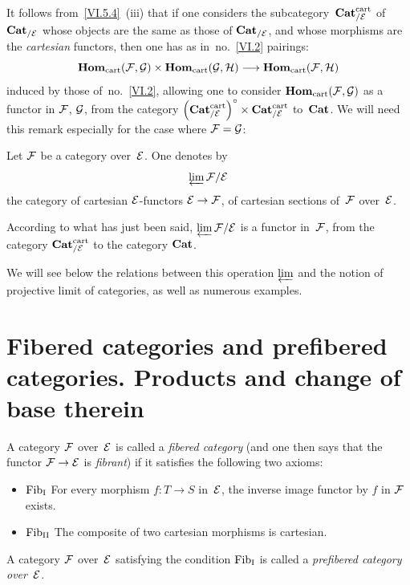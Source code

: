 It follows from~\ref{VI.5.4}~(iii) that if one considers the
subcategory~$\Cat^\cart_{/\cal{E}}$
of~$\Cat_{/\cal{E}}$ whose objects are the same as those of
$\Cat_{/\cal{E}}$, and whose morphisms are the
\emph{cartesian} functors, then one has as in~no.~\ref{VI.2} pairings:
$$
\SheafHom_\cart(\cal{F},\cal{G})\times
\SheafHom_\cart(\cal{G},\cal{H}) \to \SheafHom_\cart(\cal{F},\cal{H})
$$
induced
by those of~no.~\ref{VI.2}, allowing one to consider
$\SheafHom_\cart(\cal{F},\cal{G})$ as a functor in $\cal{F}$,
$\cal{G}$, from the category $\left(\Cat^\cart_{/\cal{E}}
\right)^\circ \times \Cat^\cart_{/\cal{E}}$
to~$\Cat$.
We will need this remark especially for the case where
$\cal{F} = \cal{G}$:

\begin{definition}
\label{VI.5.5}
Let $\cal{F}$ be a category over~$\cal{E}$. One denotes by
$$
\varprojLim\cal{F}/\cal{E}
$$
the category of cartesian $\cal{E}$-functors
$\cal{E}\to\cal{F}$, \ie of cartesian sections of~$\cal{F}$
over~$\cal{E}$.
\end{definition}

According to what has just been said,
$\varprojLim\cal{F}/\cal{E}$ is a functor
in~$\cal{F}$, from the category $\Cat^\cart_{/\cal{E}}$ to the
category $\Cat$.

We will see below the relations between this operation
$\varprojLim$ and the notion of projective limit of
categories, as well as numerous examples.

\section[Fibered categories and prefibered categories]{Fibered categories and prefibered categories. Products and change of base therein}
\label{VI.6}

\begin{definition}
\label{VI.6.1}
A category $\cal{F}$ over~$\cal{E}$ is called a
\emph{fibered category}
(and one then says that the functor $\cal{F}\to\cal{E}$ is
\emph{fibrant})
if it satisfies the following two axioms:
\begin{itemize}
\item{$\Fib_{\mathrm{I}}$}
For every morphism $f\colon T\to S$ in~$\cal{E}$, the inverse image functor
by $f$ in $\cal{F}$ exists.
\item{$\Fib_{\mathrm{II}}$} The composite of two cartesian morphisms
is cartesian.
\end{itemize}
A category $\cal{F}$ over~$\cal{E}$ satisfying the condition
$\Fib_{\mathrm{I}}$ is called a \emph{prefibered category
over~$\cal{E}$}.
\end{definition}

